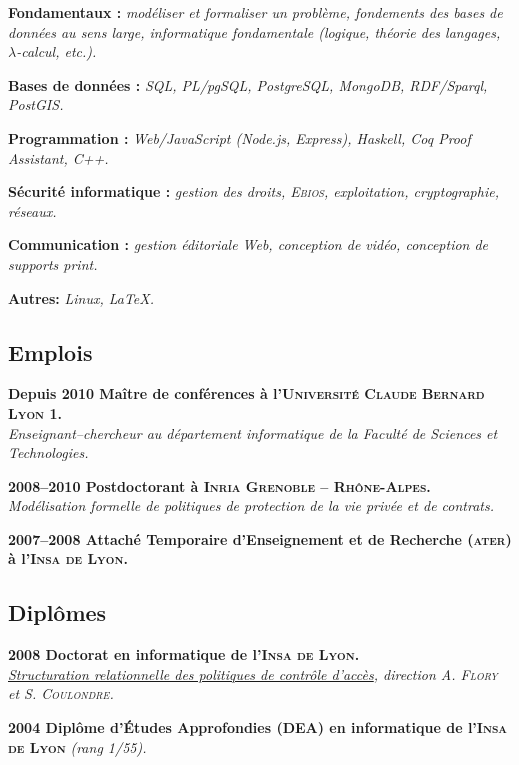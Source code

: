 \documentclass[12pt,a4paper]{article}
\newcommand{\activite}[1]{\textbf{#1}\xspace}
\newcommand{\comment}[1]{\textsl{#1}\xspace}
\newcommand{\INSAL}{\textsc{Insa de Lyon}\xspace}
\newcommand{\INRIARA}{\textsc{Inria Grenoble -- Rh\^one-Alpes}\xspace}
\newcommand{\UCBL}{\textsc{Universit{\'e} Claude Bernard Lyon 1}\xspace}
\newcommand{\ATER}{\textsc{ater}\xspace}
\begin{document}
  \activite{Fondamentaux :}
  \comment{modéliser et formaliser un problème, fondements des bases de données au sens large, informatique fondamentale (logique, théorie des langages, $\lambda$-calcul, etc.).}

  \activite{Bases de données :}
  \comment{SQL, PL/pgSQL, PostgreSQL, MongoDB, RDF/Sparql, PostGIS.}

  \activite{Programmation :}
  \comment{Web/JavaScript (Node.js, Express), Haskell, Coq Proof Assistant, C++.}

  \activite{Sécurité informatique :}
  \comment{gestion des droits, \textsc{Ebios}, exploitation, cryptographie, réseaux.}

  \activite{Communication :}
  \comment{gestion éditoriale Web, conception de vidéo, conception de supports \emph{print}.}

  \activite{Autres:}
  \comment{Linux, \LaTeX.}

\subsection*{Emplois} 

  \activite{Depuis 2010 Maître de conférences à l'\UCBL.}\\
  \comment{Enseignant--chercheur au département informatique de la Faculté de Sciences et Technologies.} 
  
  \activite{2008--2010 Postdoctorant à \INRIARA.}\\
  \comment{Modélisation formelle de politiques de protection de la vie privée et de contrats.} 
  
  \activite{2007--2008 Attaché Temporaire d'Enseignement et de Recherche (\ATER) à l'\INSAL.}

\subsection*{Diplômes}

     \activite{2008 Doctorat en informatique de l'\INSAL.}\\
    \comment{\href{https://www.theses.fr/131879375}{Structuration relationnelle des politiques de contrôle d'accès}, direction \textsc{A. Flory} et S. \textsc{Coulondre}.}
    
   \activite{2004 Diplôme d'Études Approfondies (DEA) en informatique de l'\INSAL}
    \comment{(rang 1\ier/55).}
\end{document}
